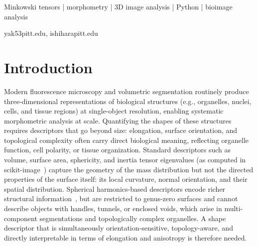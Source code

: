 \documentclass[times, twoside, watermark]{zHenriquesLab-StyleBioRxiv}
\begin{document}
\begin{keywords}
Minkowski tensors | morphometry | 3D image analysis | Python | bioimage analysis
\end{keywords}

\begin{corrauthor}
yak53\at pitt.edu,
ishihara\at pitt.edu
\end{corrauthor}


\section*{Introduction}

Modern fluorescence microscopy and volumetric segmentation routinely produce three-dimensional representations of biological structures (e.g., organelles, nuclei, cells, and tissue regions) at single-object resolution, enabling systematic morphometric analysis at scale.
Quantifying the shapes of these structures requires descriptors that go beyond size: elongation, surface orientation, and topological complexity often carry direct biological meaning, reflecting organelle function, cell polarity, or tissue organization.
Standard descriptors such as volume, surface area, sphericity, and inertia tensor eigenvalues (as computed in scikit-image~\cite{vanderwalt2014scikit}) capture the geometry of the mass distribution but not the directed properties of the surface itself: its local curvature, normal orientation, and their spatial distribution.
Spherical harmonics-based descriptors encode richer structural information~\cite{Kazhdan2003, viana2023integrated}, but are restricted to genus-zero surfaces and cannot describe objects with handles, tunnels, or enclosed voids, which arise in multi-component segmentations and topologically complex organelles.
A shape descriptor that is simultaneously orientation-sensitive, topology-aware, and directly interpretable in terms of elongation and anisotropy is therefore needed.
\end{document}
